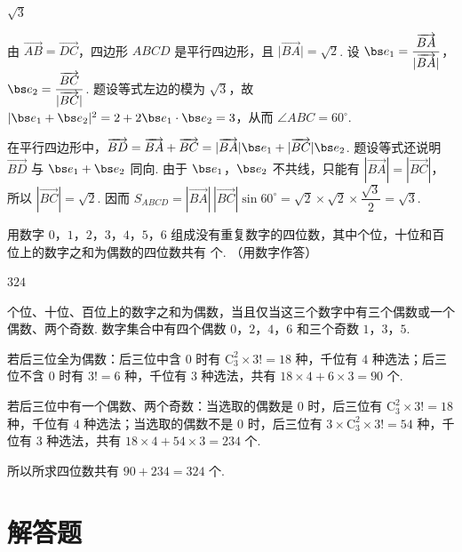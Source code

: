 \begin{answer}
\(\sqrt{3}\)
\end{answer}

\begin{solution}
由 \(\overrightarrow{AB}=\overrightarrow{DC}\)，四边形 \(ABCD\) 是平行四边形，且 \(\lvert\overrightarrow{BA}\rvert=\sqrt2\). 设 \(\bs e_1=\dfrac{\overrightarrow{BA}}{|\overrightarrow{BA}|}\)，\(\bs e_2=\dfrac{\overrightarrow{BC}}{|\overrightarrow{BC}|}\). 题设等式左边的模为 \(\sqrt3\)，故 \(\lvert\bs e_1+\bs e_2\rvert^2=2+2\bs e_1\cdot\bs e_2=3\)，从而 \(\angle ABC=60^\circ\).

在平行四边形中，\(\overrightarrow{BD}=\overrightarrow{BA}+\overrightarrow{BC}=|\overrightarrow{BA}|\bs e_1+|\overrightarrow{BC}|\bs e_2\). 题设等式还说明 \(\overrightarrow{BD}\) 与 \(\bs e_1+\bs e_2\) 同向. 由于 \(\bs e_1\)，\(\bs e_2\) 不共线，只能有 \(|\overrightarrow{BA}|=|\overrightarrow{BC}|\)，所以 \(|\overrightarrow{BC}|=\sqrt2\). 因而 \(S_{ABCD}=|\overrightarrow{BA}|\,|\overrightarrow{BC}|\sin60^\circ=\sqrt2\times\sqrt2\times\dfrac{\sqrt3}{2}=\sqrt3\).
\end{solution}

\begin{problem}
用数字 \(0\)，\(1\)，\(2\)，\(3\)，\(4\)，\(5\)，\(6\) 组成没有重复数字的四位数，其中个位，十位和百位上的数字之和为偶数的四位数共有\fillinblank{} 个. （用数字作答）
\end{problem}

\begin{answer}
\(324\)
\end{answer}

\begin{solution}
个位、十位、百位上的数字之和为偶数，当且仅当这三个数字中有三个偶数或一个偶数、两个奇数. 数字集合中有四个偶数 \(0\)，\(2\)，\(4\)，\(6\) 和三个奇数 \(1\)，\(3\)，\(5\).

若后三位全为偶数：后三位中含 \(0\) 时有 \(\mathrm C_3^2\times3!=18\) 种，千位有 \(4\) 种选法；后三位不含 \(0\) 时有 \(3!=6\) 种，千位有 \(3\) 种选法，共有 \(18\times4+6\times3=90\) 个.

若后三位中有一个偶数、两个奇数：当选取的偶数是 \(0\) 时，后三位有 \(\mathrm C_3^2\times3!=18\) 种，千位有 \(4\) 种选法；当选取的偶数不是 \(0\) 时，后三位有 \(3\times\mathrm C_3^2\times3!=54\) 种，千位有 \(3\) 种选法，共有 \(18\times4+54\times3=234\) 个.

所以所求四位数共有 \(90+234=324\) 个.
\end{solution}

\section{解答题}


